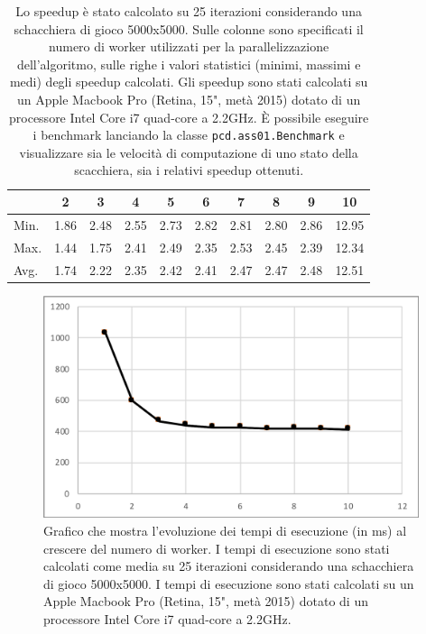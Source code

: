 \documentclass[a4paper]{article}
\begin{document}
\begin{table}[H]
\centering
\begin{tabular}{l|ccccccccc}
\hline
     & 2     & 3    & 4    & 5    & 6    & 7    & 8    & 9    & 10   \\ \hline
Min. & 1.86 & 2.48 & 2.55 & 2.73 & 2.82 & 2.81 & 2.80 & 2.86 & 12.95 \\
Max. & 1.44 & 1.75 & 2.41 & 2.49 & 2.35 & 2.53 & 2.45 & 2.39 & 12.34 \\
Avg. & 1.74 & 2.22 & 2.35 & 2.42 & 2.41 & 2.47 & 2.47 & 2.48 & 12.51 \\ \hline
\end{tabular}
\caption{Lo speedup è stato calcolato su 25 iterazioni considerando una schacchiera di gioco 5000x5000. Sulle colonne sono specificati il numero di worker utilizzati per la parallelizzazione dell'algoritmo, sulle righe i valori statistici (minimi, massimi e medi) degli speedup calcolati. Gli speedup sono stati calcolati su un Apple Macbook Pro (Retina, 15", metà 2015) dotato di un processore Intel Core i7 quad-core a 2.2GHz.
È possibile eseguire i benchmark lanciando la classe \texttt{pcd.ass01.Benchmark} e visualizzare sia le velocità di computazione di uno stato della scacchiera, sia i relativi speedup ottenuti.}
\label{speedup-table}
\end{table}

\begin{figure}[H]
    \centering
    \includegraphics[width=110mm]{res/execution_times.png}
    \caption{Grafico che mostra l'evoluzione dei tempi di esecuzione (in ms) al crescere del numero di worker. I tempi di esecuzione sono stati calcolati come media su 25 iterazioni considerando una schacchiera di gioco 5000x5000. I tempi di esecuzione sono stati calcolati su un Apple Macbook Pro (Retina, 15", metà 2015) dotato di un processore Intel Core i7 quad-core a 2.2GHz.}
    \label{fig:execution-times}
\end{figure}

\end{document}
